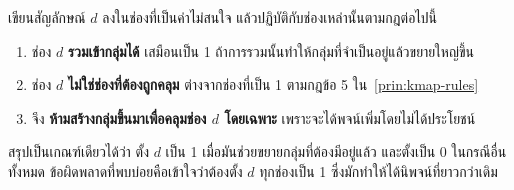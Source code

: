 \begin{principle}
\label{prin:dont-care}
เขียนสัญลักษณ์ $d$ ลงในช่องที่เป็นค่าไม่สนใจ แล้วปฏิบัติกับช่องเหล่านั้นตามกฎต่อไปนี้

\begin{enumerate}
    \item ช่อง $d$ \textbf{รวมเข้ากลุ่มได้} เสมือนเป็น 1 ถ้าการรวมนั้นทำให้กลุ่มที่จำเป็นอยู่แล้วขยายใหญ่ขึ้น
    \item ช่อง $d$ \textbf{ไม่ใช่ช่องที่ต้องถูกคลุม} ต่างจากช่องที่เป็น 1 ตามกฎข้อ 5 ใน~\autoref{prin:kmap-rules}
    \item จึง \textbf{ห้ามสร้างกลุ่มขึ้นมาเพื่อคลุมช่อง $d$ โดยเฉพาะ} เพราะจะได้พจน์เพิ่มโดยไม่ได้ประโยชน์
\end{enumerate}

สรุปเป็นเกณฑ์เดียวได้ว่า ตั้ง $d$ เป็น 1 เมื่อมันช่วยขยายกลุ่มที่ต้องมีอยู่แล้ว และตั้งเป็น 0 ในกรณีอื่นทั้งหมด ข้อผิดพลาดที่พบบ่อยคือเข้าใจว่าต้องตั้ง $d$ ทุกช่องเป็น 1 ซึ่งมักทำให้ได้นิพจน์ที่ยาวกว่าเดิม
\end{principle}

